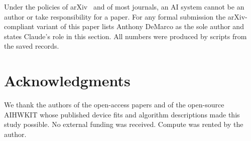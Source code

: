 Under the policies of arXiv~\cite{arxiv_policy} and of most journals, an AI system cannot be an author or take responsibility
for a paper. For any formal submission the arXiv-compliant variant of this paper lists Anthony DeMarco as the sole author and states
Claude's role in this section. All numbers were produced by scripts from the saved records.
\fi

\section*{Acknowledgments}
We thank the authors of the open-access papers and of the open-source AIHWKIT whose published device fits and algorithm
descriptions made this study possible. No external funding was received. Compute was rented by the author.




\appendix






